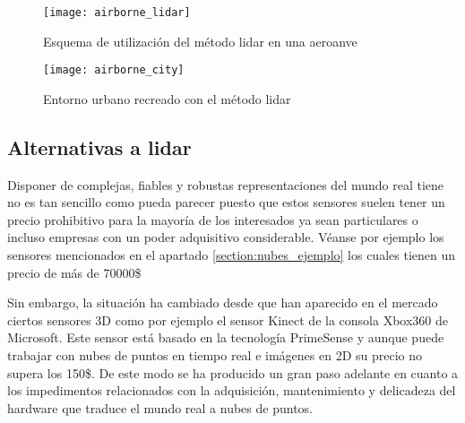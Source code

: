  
\begin{figure}
  \texttt{[image: airborne\_lidar]}
  \caption{Esquema de utilización del método lidar en una aeroanve}\label{fig:airborne_lidar}
\endminipage\hfill
{}
  \texttt{[image: airborne\_city]}
  \caption{Entorno urbano recreado con el método lidar}\label{fig:airborne_city}
\endminipage\hfill

\end{figure}





\subsection{Alternativas a lidar}

Disponer de complejas, fiables y robustas representaciones del mundo real tiene no es tan sencillo como pueda parecer puesto que estos sensores suelen tener un precio prohibitivo para la mayoría de los interesados ya sean particulares o incluso empresas con un poder adquisitivo considerable. Véanse por ejemplo los sensores mencionados en el apartado \ref{section:nubes_ejemplo} los cuales tienen un precio de más de 70000\$

Sin embargo, la situación ha cambiado desde que han aparecido en el mercado ciertos sensores 3D como por ejemplo el sensor Kinect de la consola Xbox360 de Microsoft. Este sensor está basado en la tecnología PrimeSense y aunque puede trabajar con nubes de puntos en tiempo real e imágenes en 2D su precio no supera los 150\$. De este modo se ha producido un gran paso adelante en cuanto a los impedimentos relacionados con la adquisición, mantenimiento y delicadeza del hardware que traduce el mundo real a nubes de puntos.


